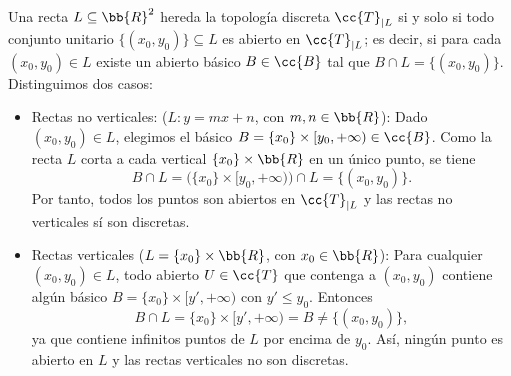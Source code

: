 \documentclass[12pt]{article}
\begin{document}
\begin{ejercicio}
\begin{enumerate}[label=\alph*)]
    Una recta $L \subseteq \bb{R}^2$ hereda la topología discreta $\cc{T}_{|L}$ si y solo si todo conjunto unitario $\{(x_0, y_0)\} \subseteq L$ es abierto en $\cc{T}_{|L}$; es decir, si para cada $(x_0, y_0) \in L$ existe un abierto básico $B \in \cc{B}$ tal que $B \cap L = \{(x_0, y_0)\}$. Distinguimos dos casos:
    \begin{itemize}
        \item Rectas no verticales: ($L : y = mx + n$, con $m, n \in \bb{R}$): Dado $(x_0, y_0) \in L$, elegimos el básico $B = \{x_0\} \times [y_0, +\infty) \in \cc{B}$. Como la recta $L$ corta a cada vertical $\{x_0\} \times \bb{R}$ en un único punto, se tiene
        \[
            B \cap L = \big(\{x_0\} \times [y_0, +\infty)\big) \cap L = \{(x_0, y_0)\}.
        \]
        Por tanto, todos los puntos son abiertos en $\cc{T}_{|L}$ y las rectas no verticales sí son discretas.
        \item Rectas verticales ($L = \{x_0\} \times \bb{R}$, con $x_0 \in \bb{R}$): Para cualquier $(x_0, y_0) \in L$, todo abierto $U \in \cc{T}$ que contenga a $(x_0, y_0)$ contiene algún básico $B = \{x_0\} \times [y', +\infty)$ con $y' \leq y_0$. Entonces
        \[
            B \cap L = \{x_0\} \times [y', +\infty) = B \neq \{(x_0, y_0)\},
        \]
        ya que contiene infinitos puntos de $L$ por encima de $y_0$. Así, ningún punto es abierto en $L$ y las rectas verticales no son discretas.
    \end{itemize}

    \begin{center}
    \end{center}


\end{enumerate}
\end{ejercicio}
\end{document}
